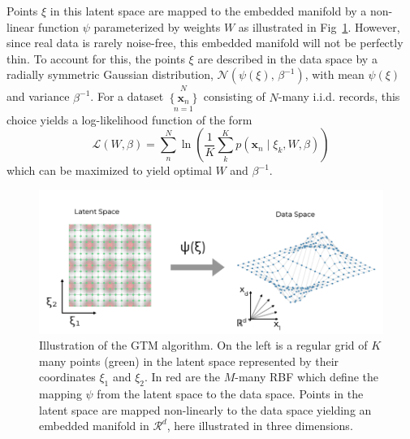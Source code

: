 \documentclass[remotesensing,article,submit,pdftex,moreauthors]{Definitions/mdpi}
\begin{document}
Points $\xi$ in this latent space are mapped to the embedded manifold by a non-linear function $\psi$ parameterized by weights $W$ as illustrated in Fig~\ref{fig:gtm-diagram}. However, since real data is rarely noise-free, this embedded manifold will not be perfectly thin. To account for this, the points $\xi$ are described in the data space by a radially symmetric Gaussian distribution, $\mathcal{N}(\psi(\xi),\, \beta^{-1})$, with mean $\psi(\xi)$ and variance $\beta^{-1}$. For a dataset $\left\{ \mathbf{x}_n\right\}\limits_{n=1}^N$ consisting of $N$-many i.i.d. records, this choice yields a log-likelihood function of the form
\begin{equation}\label{eq:llh}
    \mathcal{L}(W, \beta) = \sum_n^N \ln \left(\dfrac{1}{K}\sum_k^K p(\mathbf{x}_n \mid \xi_k, W, \beta) \right)
\end{equation}
which can be maximized to yield optimal $W$ and $\beta^{-1}$.

\begin{figure}[t]
\centering
\includegraphics[width=\columnwidth]{paper/figures/methods/gtm-diagram.png}
\caption{Illustration of the GTM algorithm. On the left is a regular grid of $K$ many points (green) in the latent space represented by their coordinates $\xi_1$ and $\xi_2$. In red are the $M$-many RBF which define the mapping $\psi$ from the latent space to the data space. Points in the latent space are mapped non-linearly to the data space yielding an embedded manifold in $\mathcal{R}^d$, here illustrated in three dimensions.\label{fig:gtm-diagram}}
\end{figure}  
\end{document}
